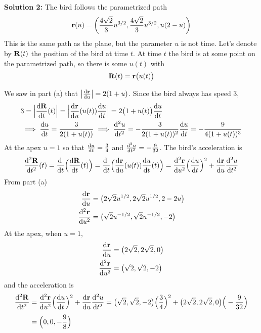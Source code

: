 \begin{solution}
	\textbf{Solution 2:}
	\qquad
	The bird follows the parametrized path 
	\begin{equation*}
	\mathbf{r}(u)=\left(\frac{4\sqrt{2}}{3}u^{3/2},\frac{4\sqrt{2}}{3}u^{3/2},
	u(2-u)\right)
	\end{equation*}
	This is the same path as the plane, but the parameter
	$u$ is not time. Let's denote by $\mathbf{R}(t)$ the position of 
	the bird at time $t$. At time $t$ the bird is at some point on
	the parametrized path, so there is some $u(t)$ with
	\begin{equation*}
	\mathbf{R}(t) = \mathbf{r}\big(u(t)\big)
	\end{equation*} 
	
	We saw in part (a) that $\big|\diff{\vr}{u}\big|
	=2(1+u)$. Since the bird always has speed $3$,
	\begin{align*}
	&3=\Big|\diff{\vR}{t}(t)\Big|=\Big|\diff{\vr}{u}(u(t))\diff{u}{t}\Big|
	=2\big(1+u(t)\big)\diff{u}{t} \\
	&\implies \diff{u}{t}=\frac{3}{2(1+u(t))}
	\implies \difftwo{u}{t}=-\frac{3}{2(1+u(t))^2}\diff{u}{t}
	=-\frac{9}{4(1+u(t))^3}
	\end{align*}
	At the apex $u=1$ so that $\diff{u}{t}=\frac{3}{4}$ and 
	$\difftwo{u}{t}=-\frac{9}{32}$. The bird's acceleration is
	$$
	\difftwo{\vR}{t}(t)=\diff{}{t}\Big(\diff{\vR}{t}(t)\Big)
	=\diff{\hfill}{t}\Big(\diff{\vr}{u}(u(t))\diff{u}{t}(t)\Big)
	=\difftwo{\vr}{u}\Big(\diff{u}{t}\Big)^2
	+\diff{\vr}{u}\difftwo{u}{t}
	$$
	From part (a)
	\begin{align*}
	\diff{\vr}{u}&=\big(2\sqrt{2}u^{1/2},2\sqrt{2}u^{1/2},2-2u\big)\\
	\difftwo{\vr}{u}&=\big(\sqrt{2}u^{-1/2},\sqrt{2}u^{-1/2},-2\big)\\
	\end{align*}
	At the apex, when $u=1$,
	\begin{align*}
	\diff{\vr}{u}&=\big(2\sqrt{2},2\sqrt{2},0\big)\\
	\difftwo{\vr}{u}&=\big(\sqrt{2},\sqrt{2},-2\big)\\
	\end{align*}
	and the acceleration is
	\begin{align*}
	\difftwo{\vR}{t}
	&=\difftwo{\vr}{u}\Big(\diff{u}{t}\Big)^2
	+\diff{\vr}{u}\difftwo{u}{t}
	=\big(\sqrt{2},\sqrt{2},-2\big)\Big(\frac{3}{4}\Big)^2
	+\big(2\sqrt{2},2\sqrt{2},0\big)\Big(-\frac{9}{32}\Big) \\[0.05in]
	&=\Big(0,0,-\frac{9}{8}\Big)
	\end{align*}
\end{solution}
